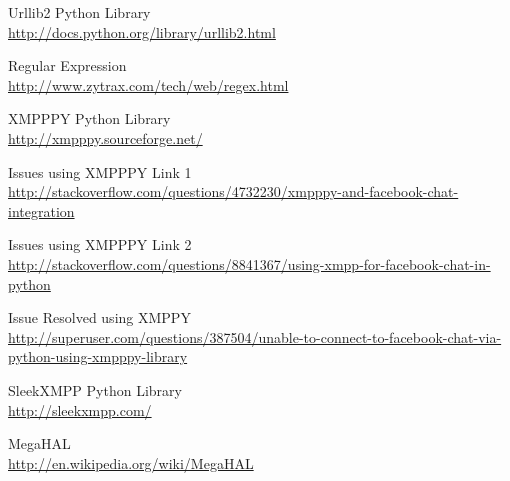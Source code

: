 \begin{thebibliography}{99}
Urllib2 Python Library\\ \url{http://docs.python.org/library/urllib2.html}

Regular Expression\\ \url{http://www.zytrax.com/tech/web/regex.html}

XMPPPY Python Library\\ \url{http://xmpppy.sourceforge.net/}

Issues using XMPPPY Link 1\\ \url{http://stackoverflow.com/questions/4732230/xmpppy-and-facebook-chat-integration}

Issues using XMPPPY Link 2\\ \url{http://stackoverflow.com/questions/8841367/using-xmpp-for-facebook-chat-in-python}

Issue Resolved using XMPPY\\ \url{http://superuser.com/questions/387504/unable-to-connect-to-facebook-chat-via-python-using-xmpppy-library}

SleekXMPP Python Library\\ \url{http://sleekxmpp.com/}

MegaHAL\\ \url{http://en.wikipedia.org/wiki/MegaHAL}







\end{thebibliography}
